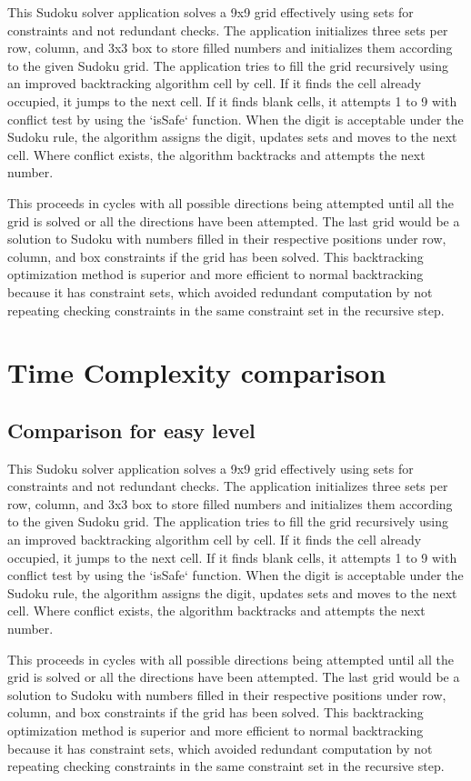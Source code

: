 \documentclass[conference]{IEEEtran}
\begin{document}
This Sudoku solver application solves a 9x9 grid effectively using sets for constraints and not redundant checks. The application initializes three sets per row, column, and 3x3 box to store filled numbers and initializes them according to the given Sudoku grid. The application tries to fill the grid recursively using an improved backtracking algorithm cell by cell. If it finds the cell already occupied, it jumps to the next cell. If it finds blank cells, it attempts 1 to 9 with conflict test by using the `isSafe` function. When the digit is acceptable under the Sudoku rule, the algorithm assigns the digit, updates sets and moves to the next cell. Where conflict exists, the algorithm backtracks and attempts the next number.

This proceeds in cycles with all possible directions being attempted until all the grid is solved or all the directions have been attempted. The last grid would be a solution to Sudoku with numbers filled in their respective positions under row, column, and box constraints if the grid has been solved. This backtracking optimization method is superior and more efficient to normal backtracking because it has constraint sets, which avoided redundant computation by not repeating checking constraints in the same constraint set in the recursive step.
\section{Time Complexity comparison} 
\subsection{Comparison for easy level}
This Sudoku solver application solves a 9x9 grid effectively using sets for constraints and not redundant checks. The application initializes three sets per row, column, and 3x3 box to store filled numbers and initializes them according to the given Sudoku grid. The application tries to fill the grid recursively using an improved backtracking algorithm cell by cell. If it finds the cell already occupied, it jumps to the next cell. If it finds blank cells, it attempts 1 to 9 with conflict test by using the `isSafe` function. When the digit is acceptable under the Sudoku rule, the algorithm assigns the digit, updates sets and moves to the next cell. Where conflict exists, the algorithm backtracks and attempts the next number.

This proceeds in cycles with all possible directions being attempted until all the grid is solved or all the directions have been attempted. The last grid would be a solution to Sudoku with numbers filled in their respective positions under row, column, and box constraints if the grid has been solved. This backtracking optimization method is superior and more efficient to normal backtracking because it has constraint sets, which avoided redundant computation by not repeating checking constraints in the same constraint set in the recursive step.
\end{document}

